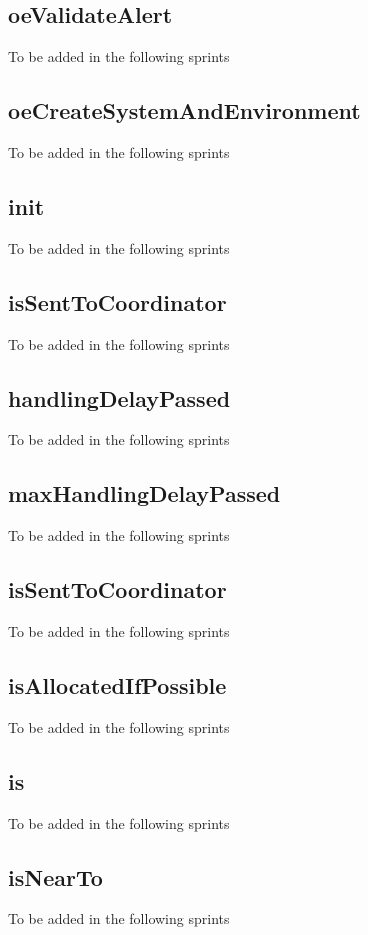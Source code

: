 \subsection{oeValidateAlert}
To be added in the following sprints

\subsection{oeCreateSystemAndEnvironment}
To be added in the following sprints

\subsection{init}
To be added in the following sprints

\subsection{isSentToCoordinator}
To be added in the following sprints

\subsection{handlingDelayPassed}
To be added in the following sprints

\subsection{maxHandlingDelayPassed}
To be added in the following sprints

\subsection{isSentToCoordinator}
To be added in the following sprints

\subsection{isAllocatedIfPossible}
To be added in the following sprints

\subsection{is}
To be added in the following sprints

\subsection{isNearTo}
To be added in the following sprints




